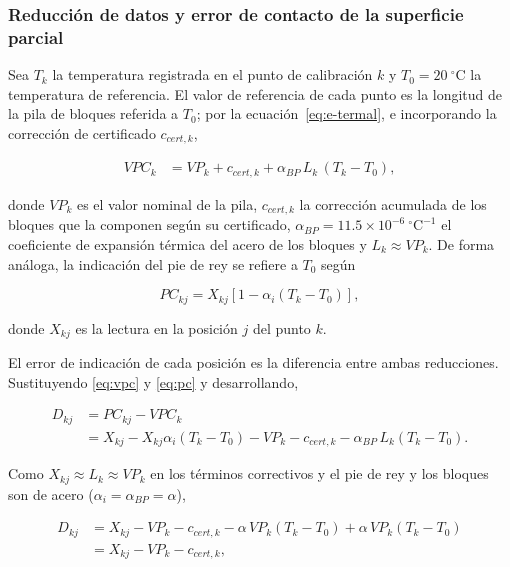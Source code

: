 \subsubsection{Reducción de datos y error de contacto de la superficie parcial}
\label{sec:pie-rey-reduccion}

Sea $T_k$ la temperatura registrada en el punto de calibración $k$ y
$T_0 = 20\ ^\circ\text{C}$ la temperatura de referencia. El valor de referencia de
cada punto es la longitud de la pila de bloques referida a $T_0$; por la
ecuación~\eqref{eq:e-termal}, e incorporando la corrección de certificado
$c_{cert,k}$,

\begin{align}
  VPC_k &= VP_k + c_{cert,k} + \alpha_{BP}\, L_k\,(T_k - T_0),
  \label{eq:vpc}
\end{align}

donde $VP_k$ es el valor nominal de la pila, $c_{cert,k}$ la corrección acumulada de
los bloques que la componen según su certificado,
$\alpha_{BP} = 11.5\times 10^{-6}\ ^\circ\text{C}^{-1}$ el coeficiente de expansión
térmica del acero de los bloques y $L_k \approx VP_k$. De forma análoga, la
indicación del pie de rey se refiere a $T_0$ según

\begin{equation}
  PC_{kj} = X_{kj}\left[1 - \alpha_i (T_k - T_0)\right],
  \label{eq:pc}
\end{equation}

donde $X_{kj}$ es la lectura en la posición $j$ del punto $k$.

El error de indicación de cada posición es la diferencia entre ambas reducciones.
Sustituyendo \eqref{eq:vpc} y \eqref{eq:pc} y desarrollando,

\begin{align}
  D_{kj} &= PC_{kj} - VPC_k \nonumber\\
  &= X_{kj} - X_{kj}\alpha_i (T_k - T_0) - VP_k - c_{cert,k}
     - \alpha_{BP}\,L_k (T_k - T_0). \label{eq:D-desarrollo}
\end{align}

Como $X_{kj} \approx L_k \approx VP_k$ en los términos correctivos y el pie de rey y
los bloques son de acero ($\alpha_i = \alpha_{BP} = \alpha$),

\begin{align*}
  D_{kj} &= X_{kj} - VP_k - c_{cert,k}
     - \alpha\,VP_k (T_k - T_0) + \alpha\,VP_k (T_k - T_0) \\
  &= X_{kj} - VP_k - c_{cert,k},
\end{align*}

